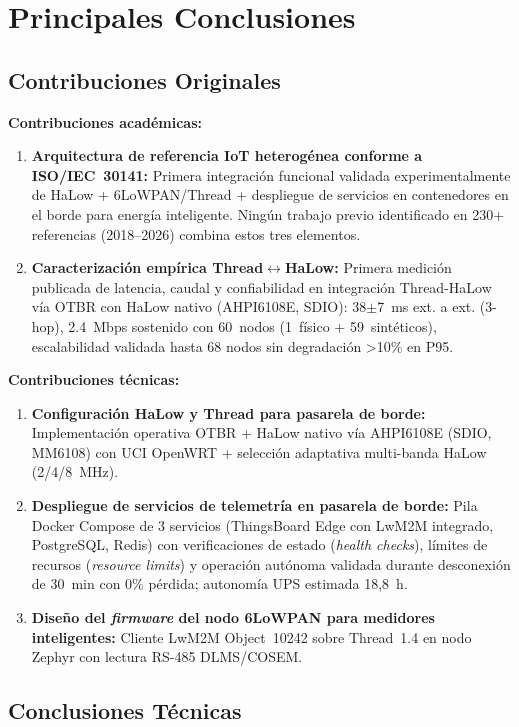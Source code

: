 \section{Principales Conclusiones}

\subsection{Contribuciones Originales}

\textbf{Contribuciones académicas:}
\begin{enumerate}
\item \textbf{Arquitectura de referencia IoT heterogénea conforme a ISO/IEC~30141:} Primera integración funcional validada experimentalmente de HaLow + 6LoWPAN/Thread + despliegue de servicios en contenedores en el borde para energía inteligente. Ningún trabajo previo identificado en 230+ referencias (2018--2026) combina estos tres elementos.
\item \textbf{Caracterización empírica Thread$\leftrightarrow$HaLow:} Primera medición publicada de latencia, caudal y confiabilidad en integración Thread-HaLow vía OTBR con HaLow nativo (AHPI6108E, SDIO): 38$\pm$7~ms ext. a ext. (3-hop), 2.4~Mbps sostenido con 60~nodos (1~físico + 59~sintéticos), escalabilidad validada hasta 68 nodos sin degradación >10\% en P95.
\end{enumerate}

\textbf{Contribuciones técnicas:}
\begin{enumerate}
\item \textbf{Configuración HaLow y Thread para pasarela de borde:} Implementación operativa OTBR + HaLow nativo vía AHPI6108E (SDIO, MM6108) con UCI OpenWRT + selección adaptativa multi-banda HaLow (2/4/8~MHz).
\item \textbf{Despliegue de servicios de telemetría en pasarela de borde:} Pila Docker Compose de 3 servicios (ThingsBoard Edge con LwM2M integrado, PostgreSQL, Redis) con verificaciones de estado (\emph{health checks}), límites de recursos (\emph{resource limits}) y operación autónoma validada durante desconexión de 30~min con 0\% pérdida; autonomía UPS estimada 18,8~h.
\item \textbf{Diseño del \emph{firmware} del nodo 6LoWPAN para medidores inteligentes:} Cliente LwM2M Object~10242 sobre Thread~1.4 en nodo Zephyr con lectura RS-485 DLMS/COSEM.
\end{enumerate}

\subsection{Conclusiones Técnicas}

